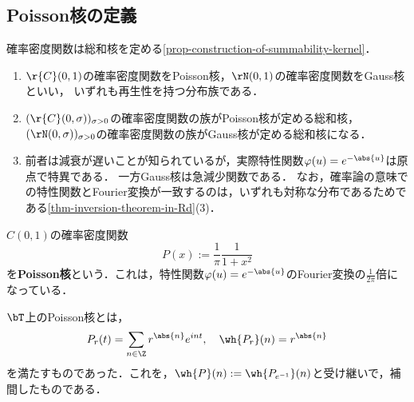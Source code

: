 \documentclass[uplatex,dvipdfmx]{jsreport}
\begin{document}
\subsection{Poisson核の定義}

\begin{tcolorbox}[colframe=ForestGreen, colback=ForestGreen!10!white,breakable,colbacktitle=ForestGreen!40!white,coltitle=black,fonttitle=\bfseries\sffamily,
    title=]
    確率密度関数は総和核を定める\ref{prop-construction-of-summability-kernel}．
    \begin{enumerate}
        \item $\r{C}(0,1)$の確率密度関数をPoisson核，$\rN(0,1)$の確率密度関数をGauss核といい，
        いずれも再生性を持つ分布族である．
        \item $(\r{C}(0,\sigma))_{\sigma>0}$の確率密度関数の族がPoisson核が定める総和核，
        $(\rN(0,\sigma))_{\sigma>0}$の確率密度関数の族がGauss核が定める総和核になる．
        \item 前者は減衰が遅いことが知られているが，実際特性関数$\varphi(u)=e^{-\abs{u}}$は原点で特異である．
        一方Gauss核は急減少関数である．
        なお，確率論の意味での特性関数とFourier変換が一致するのは，いずれも対称な分布であるためである\ref{thm-inversion-theorem-in-Rd}(3)．
    \end{enumerate}
\end{tcolorbox}

\begin{definition}\label{def-Poisson-kernel}
    $C(0,1)$の確率密度関数
    \[P(x):=\frac{1}{\pi}\frac{1}{1+x^2}\]
    を\textbf{Poisson核}という．これは，特性関数$\varphi(u)=e^{-\abs{u}}$のFourier変換の$\frac{1}{2\pi}$倍になっている．
\end{definition}
\begin{remarks}[$\bT$上のPoisson核とFourier変換を通じて緩く対応している]
    $\bT$上のPoisson核とは，
    \[P_r(t)=\sum_{n\in\Z}r^{\abs{n}}e^{int},\quad\wh{P_r}(n)=r^{\abs{n}}\]
    を満たすものであった．これを，$\wh{P}(n):=\wh{P_{e^{-1}}}(n)$と受け継いで，補間したものである．
\end{remarks}
\end{document}
